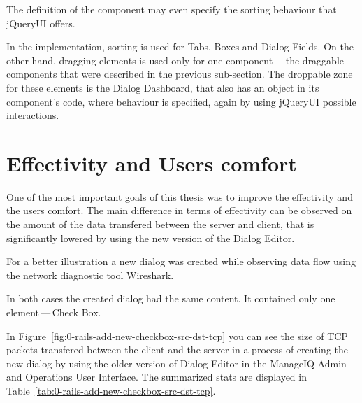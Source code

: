 The definition of the component may even specify the sorting behaviour that
jQueryUI offers.

In the implementation, sorting is used for Tabs, Boxes and Dialog Fields.
On the other hand, dragging elements is used only for one component\,---\,the
draggable components that were described in the previous sub-section.
The droppable zone for these elements is the Dialog Dashboard, that also has an
object in its component's code, where behaviour is specified, again by
using jQueryUI possible interactions.

\chapter{Effectivity and Users comfort}\label{ch:effectivity}

One of the most important goals of this thesis was to improve the effectivity
and the users comfort.
The main difference in terms of effectivity can be observed on the amount of
the data transfered between the server and client, that is significantly
lowered by using the new version of the Dialog Editor.

For a better illustration a new dialog was created while observing data flow
using the network diagnostic tool Wireshark.

In both cases the created dialog had the same content. It contained only one
element\,---\,Check Box.

In Figure~\ref{fig:0-rails-add-new-checkbox-src-dst-tcp} you can see the
size of TCP packets transfered between the client and the server in a process
of creating the new dialog by using the older version of Dialog Editor in the
ManageIQ Admin and Operations User Interface.
The summarized stats are displayed in Table~\ref{tab:0-rails-add-new-checkbox-src-dst-tcp}.

